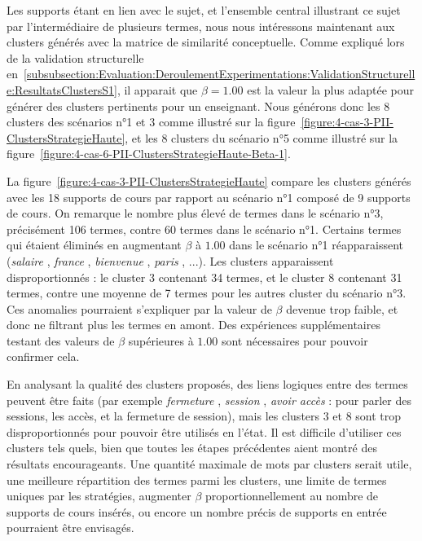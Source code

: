 Les supports étant en lien avec le sujet, et l'ensemble central illustrant ce sujet par l'intermédiaire de plusieurs termes, nous nous intéressons maintenant aux clusters générés avec la matrice de similarité conceptuelle.
Comme expliqué lors de la validation structurelle en~\ref{subsubsection:Evaluation:DeroulementExperimentations:ValidationStructurelle:ResultatsClustersS1}, il apparait que $ \beta = 1.00 $ est la valeur la plus adaptée pour générer des clusters pertinents pour un enseignant.
Nous générons donc les 8 clusters des scénarios n°1 et 3 comme illustré sur la figure~\ref{figure:4-cas-3-PII-ClustersStrategieHaute}, et les 8 clusters du scénario n°5 comme illustré sur la figure~\ref{figure:4-cas-6-PII-ClustersStrategieHaute-Beta-1}.

\bigskip



La figure~\ref{figure:4-cas-3-PII-ClustersStrategieHaute} compare les clusters générés avec les 18 supports de cours par rapport au scénario n°1 composé de 9 supports de cours.
On remarque le nombre plus élevé de termes dans le scénario n°3, précisément 106 termes, contre 60 termes dans le scénario n°1.
Certains termes qui étaient éliminés en augmentant $ \beta $ à $ 1.00 $ dans le scénario n°1 réapparaissent (\og \textit{salaire} \fg, \og \textit{france} \fg, \og \textit{bienvenue} \fg, \og \textit{paris} \fg, ...).
Les clusters apparaissent disproportionnés : le cluster 3 contenant 34 termes, et le cluster 8 contenant 31 termes, contre une moyenne de 7 termes pour les autres cluster du scénario n°3.
Ces anomalies pourraient s'expliquer par la valeur de $ \beta $ devenue trop faible, et donc ne filtrant plus les termes en amont.
Des expériences supplémentaires testant des valeurs de $ \beta $ supérieures à $ 1.00 $ sont nécessaires pour pouvoir confirmer cela.

\bigskip

En analysant la qualité des clusters proposés, des liens logiques entre des termes peuvent être faits (par exemple \og \textit{fermeture} \fg, \og \textit{session} \fg, \og \textit{avoir accès} \fg : pour parler des sessions, les accès, et la fermeture de session), mais les clusters 3 et 8 sont trop disproportionnés pour pouvoir être utilisés en l'état.
Il est difficile d'utiliser ces clusters tels quels, bien que toutes les étapes précédentes aient montré des résultats encourageants.
Une quantité maximale de mots par clusters serait utile, une meilleure répartition des termes parmi les clusters, une limite de termes uniques par les stratégies, augmenter $ \beta $ proportionnellement au nombre de supports de cours insérés, ou encore un nombre précis de supports en entrée pourraient être envisagés.



